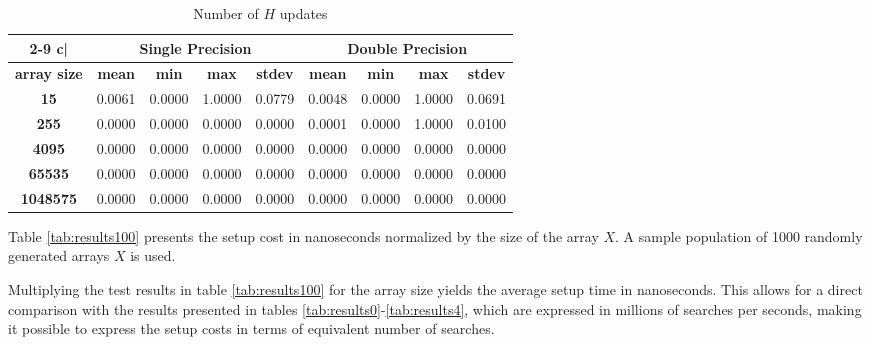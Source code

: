 \documentclass[preprint,1p,times]{elsarticle}
\begin{document}
\begin{table}[ht]
	\footnotesize
	\centering
	\begin{tabular}{| c | c c c c | c c c c |}
		\cline{2-9}
		\multicolumn{1} {c|}{}  & \multicolumn{4}{c|}{\textbf{Single Precision}}  & \multicolumn{4}{c|}{\textbf{Double Precision}} \\
		\hline
		\textbf{array size} & \textbf{mean} & \textbf{min} & \textbf{max} & \textbf{stdev} & \textbf{mean} & \textbf{min} & \textbf{max} & \textbf{stdev} \\
		\hline
		\multicolumn{1}{|c|}{\textbf{15}                                    } &     0.0061 &     0.0000 &     1.0000 &     0.0779 &     0.0048 &     0.0000 &     1.0000 &     0.0691 \\
		\multicolumn{1}{|c|}{\textbf{255}                                   } &     0.0000 &     0.0000 &     0.0000 &     0.0000 &     0.0001 &     0.0000 &     1.0000 &     0.0100 \\
		\multicolumn{1}{|c|}{\textbf{4095}                                  } &     0.0000 &     0.0000 &     0.0000 &     0.0000 &     0.0000 &     0.0000 &     0.0000 &     0.0000 \\
		\multicolumn{1}{|c|}{\textbf{65535}                                 } &     0.0000 &     0.0000 &     0.0000 &     0.0000 &     0.0000 &     0.0000 &     0.0000 &     0.0000 \\
		\multicolumn{1}{|c|}{\textbf{1048575}                               } &     0.0000 &     0.0000 &     0.0000 &     0.0000 &     0.0000 &     0.0000 &     0.0000 &     0.0000 \\
		\hline
	\end{tabular}
	\caption{Number of $H$ updates}
	\label{tab:results101}
\end{table}

Table \ref{tab:results100} presents the setup cost in nanoseconds normalized by the size of the array $X$. A sample population of 1000 randomly generated arrays $X$ is used.

Multiplying the test results in table \ref{tab:results100} for the array size yields the average setup time in nanoseconds. This allows for a direct comparison with the results presented in tables  \ref{tab:results0}-\ref{tab:results4}, which are expressed in millions of searches per seconds, making it possible to express the setup costs in terms of equivalent number of searches.
\end{document}
